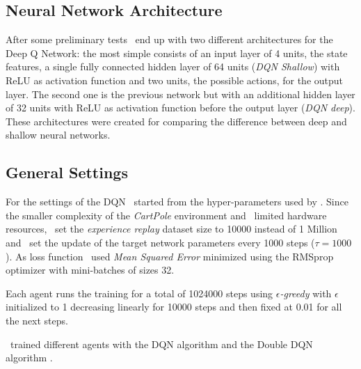 \subsection{Neural Network Architecture}

After some preliminary tests \auth~end up with two different architectures for the Deep Q Network: the most simple consists of an input layer of 4 units, the state features, a single fully connected hidden layer of 64 units (\textit{DQN Shallow}) with ReLU as activation function and two units, the possible actions, for the output layer. The second one is the previous network but with an additional hidden layer of 32 units with ReLU as activation function before the output layer (\textit{DQN deep}). %
These architectures were created for comparing the difference between deep and shallow neural networks.

\subsection{General Settings}

For the settings of the DQN \auth~started from the hyper-parameters used by \citeauthor{Hasselt:2016:DRL:3016100.3016191} . Since the smaller complexity of the \textit{CartPole} environment and \authpp~limited hardware resources, \auth~set the \textit{experience replay} dataset size to 10000 instead of 1 Million and \auth~set the update of the target network parameters every 1000 steps ($\tau = 1000$). As loss function \auth~used \textit{Mean Squared Error} minimized using the RMSprop optimizer with mini-batches of sizes 32.

Each agent runs the training for a total of 1024000 steps using \textit{$\epsilon$-greedy} with $\epsilon$ initialized to 1 decreasing linearly for 10000 steps and then fixed at 0.01 for all the next steps.

\Auth~trained different agents with the DQN algorithm \cite{Mnih2015} and the Double DQN algorithm \cite{Hasselt:2016:DRL:3016100.3016191}.

